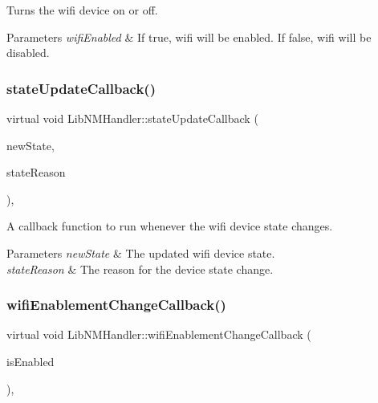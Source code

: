 Turns the wifi device on or off.


\begin{DoxyParams}{Parameters}
{\em wifi\+Enabled} & If true, wifi will be enabled. If false, wifi will be disabled. \\
\hline
\end{DoxyParams}
\mbox{\label{classLibNMHandler_ac1354c45a99afddae6407e7a52a42556}} 
\subsubsection{\texorpdfstring{state\+Update\+Callback()}{stateUpdateCallback()}}
{\footnotesize\ttfamily virtual void Lib\+N\+M\+Handler\+::state\+Update\+Callback (\begin{DoxyParamCaption}\item[{N\+M\+Device\+State}]{new\+State,  }\item[{N\+M\+Device\+State\+Reason}]{state\+Reason }\end{DoxyParamCaption})\hspace{0.3cm}{\ttfamily [protected]}, {}}

A callback function to run whenever the wifi device state changes.


\begin{DoxyParams}{Parameters}
{\em new\+State} & The updated wifi device state.\\
\hline
{\em state\+Reason} & The reason for the device state change. \\
\hline
\end{DoxyParams}
\mbox{\label{classLibNMHandler_ae607be1fd17c0b6fc20e824bf40cc23f}} 
\subsubsection{\texorpdfstring{wifi\+Enablement\+Change\+Callback()}{wifiEnablementChangeCallback()}}
{\footnotesize\ttfamily virtual void Lib\+N\+M\+Handler\+::wifi\+Enablement\+Change\+Callback (\begin{DoxyParamCaption}\item[{bool}]{is\+Enabled }\end{DoxyParamCaption})\hspace{0.3cm}{\ttfamily [protected]}, {}}

